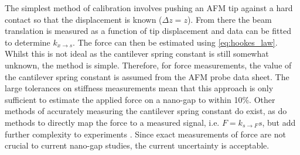 \documentclass{article}
\begin{document}
The simplest method of calibration involves pushing an AFM tip against a hard contact so that the displacement is known ($\Delta z = z$). From there the beam translation is measured as a function of tip displacement and data can be fitted to determine $k_{x \rightarrow s}$. The force can then be estimated using \eqref{eq:hookes_law}. Whilst this is not ideal as the cantilever spring constant is still somewhat unknown, the method is simple. Therefore, for force measurements, the value of the cantilever spring constant is assumed from the AFM probe data sheet. The large tolerances on stiffness measurements mean that this approach is only sufficient to estimate the applied force on a nano-gap to within {\color{red}10\%}. Other methods of accurately measuring the cantilever spring constant do exist, as do methods to directly map the force to a measured signal, i.e. $F = k_{s \rightarrow F}s$, but add further complexity to experiments \cite{hutter1993calibration, senden1994experimental, torii1996method, sader1999calibration, levy2002measuring, cumpson2004quantitative, gates2007precise, langlois2007spring, ohler2007cantilever}. Since exact measurements of force are not crucial to current nano-gap studies, the current uncertainty is acceptable.

\FloatBarrier
\end{document}
